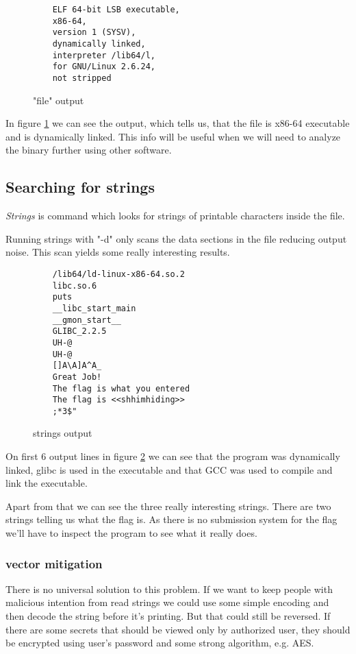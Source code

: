 \documentclass[conference]{IEEEtran}
\begin{document}
\begin{figure}[ht!]
    \begin{lstlisting}
    ELF 64-bit LSB executable,
    x86-64,
    version 1 (SYSV), 
    dynamically linked, 
    interpreter /lib64/l, 
    for GNU/Linux 2.6.24, 
    not stripped
    \end{lstlisting}
    \caption{"file" output}
    \label{fig:file_output}
\end{figure}

In figure \ref{fig:file_output} we can see the output, which tells us, that the file is x86-64 executable and is dynamically linked. This info will be useful when we will need to analyze the binary further using other software.

\subsection{Searching for strings}
\textit{Strings} is command which looks for strings of printable characters inside the file.

Running strings with "-d" only scans the data sections in the file reducing output noise.
This scan yields some really interesting results.

\begin{figure}[ht!]
    \begin{lstlisting}
    /lib64/ld-linux-x86-64.so.2
    libc.so.6
    puts
    __libc_start_main
    __gmon_start__
    GLIBC_2.2.5
    UH-@
    UH-@
    []A\A]A^A_
    Great Job! 
    The flag is what you entered
    The flag is <<shhimhiding>>
    ;*3$"
    \end{lstlisting}
    \caption{strings output}
    \label{fig:strings_output}
\end{figure}

On first 6 output lines in figure \ref{fig:strings_output} we can see that the program was dynamically linked, glibc is used in the executable and that GCC was used to compile and link the executable.

Apart from that we can see the three really interesting strings.
There are two strings telling us what the flag is. As there is no submission system for the flag we'll have to inspect the program to see what it really does.

\subsubsection{vector mitigation}
There is no universal solution to this problem. If we want to keep people with malicious intention from read strings we could use some simple encoding and then decode the string before it's printing. 
But that could still be reversed.
If there are some secrets that should be viewed only by authorized user, they should be encrypted using user's password and some strong algorithm, e.g. AES.
\end{document}
